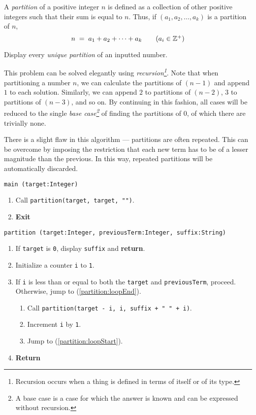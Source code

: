 

\problem A {\em partition} of a positive integer $n$ is defined as a collection of other positive integers such that
their sum is equal to $n$. Thus, if $(a_1, a_2, \dots, a_k)$ is a partition of $n$,
\begin{equation*}
	n	\;=\;	a_1 + a_2 + \dots + a_k 			\tag{$a_i \in \mathbb{Z}^{+}$}
\end{equation*}

Display every {\em unique partition} of an inputted number.

\solution This problem can be solved elegantly using {\em recursion\footnote{Recursion occurs when a thing is defined in terms of itself or of its type.}}. Note that when partitioning a number $n$, we can calculate the partitions of $(n - 1)$ and append $1$ to each solution. Similarly, we can append $2$ to partitions of $(n - 2)$, $3$ to partitions of $(n - 3)$, and so on. By continuing in this fashion, all cases will be reduced to the single {\em base case\footnote{A base case is a case for which the answer is known and can be expressed without recursion.}} of finding the partitions of $0$, of which there are trivially none.\citeneeded

There is a slight flaw in this algorithm --- partitions are often repeated. This can be overcome by imposing the restriction that each new term has to be of a lesser magnitude than the previous. In this way, repeated partitions will be automatically discarded.

\algorithm
{\tt main (target:Integer)}
\begin{enumerate}
	\item	Call {\tt partition(target, target, "")}.
	\item	{\bf Exit}
\end{enumerate}
\vspace{5mm}
{\tt partition (target:Integer, previousTerm:Integer, suffix:String)}
\begin{enumerate}
	\item	If {\tt target} is {\tt 0}, display {\tt suffix} and {\bf return}.
	\item	Initialize a counter {\tt i} to {\tt 1}.
	\item	If {\tt i} is less than or equal to both the {\tt target} and {\tt previousTerm}, proceed.
			Otherwise, jump to (\ref{partition:loopEnd}). \label{partition:loopStart}
	\begin{enumerate}
		\item	Call {\tt partition(target - i, i, suffix + " " + i)}.
		\item	Increment {\tt i} by {\tt 1}.
		\item	Jump to (\ref{partition:loopStart}).
	\end{enumerate}
	\item	{\bf Return} \label{partition:loopEnd}
\end{enumerate}

